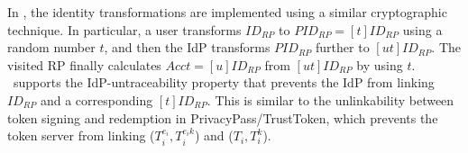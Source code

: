 In \usso, the identity transformations are implemented using a similar cryptographic technique. In particular, a user transforms $ID_{RP}$ to $PID_{RP} = [t]ID_{RP}$ using a random number $t$, and then the IdP transforms $PID_{RP}$ further to $[ut]ID_{RP}$. The visited RP finally calculates $Acct = [u]ID_{RP}$ from $[ut]ID_{RP}$ by using $t$.
\usso\ supports the IdP-untraceability property that prevents the IdP from linking $ID_{RP}$ and a corresponding $[t]ID_{RP}$. %
 This is similar to the unlinkability between token signing and redemption in PrivacyPass/TrustToken, which prevents the token server from linking ($T_i^{e_i}, T_i^{e_ik}$) and  ($T_i, T_i^k$). %

